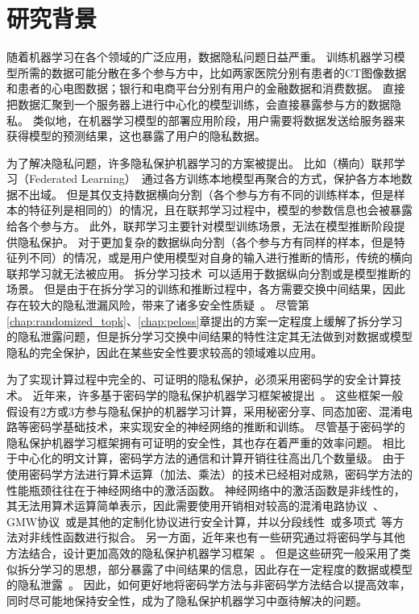 \section{研究背景}
随着机器学习在各个领域的广泛应用，数据隐私问题日益严重。
%
训练机器学习模型所需的数据可能分散在多个参与方中，比如两家医院分别有患者的CT图像数据和患者的心电图数据；银行和电商平台分别有用户的金融数据和消费数据。
%
直接把数据汇聚到一个服务器上进行中心化的模型训练，会直接暴露参与方的数据隐私。
%
类似地，在机器学习模型的部署应用阶段，用户需要将数据发送给服务器来获得模型的预测结果，这也暴露了用户的隐私数据。

%
为了解决隐私问题，许多隐私保护机器学习的方案被提出。
%
比如（横向）联邦学习（Federated Learning）~\cite{yangqiang2019federated,mcmahan_2017_fedavg}通过各方训练本地模型再聚合的方式，保护各方本地数据不出域。
但是其仅支持数据横向分割（各个参与方有不同的训练样本，但是样本的特征列是相同的）的情况，且在联邦学习过程中，模型的参数信息也会被暴露给各个参与方。
%
此外，联邦学习主要针对模型训练场景，无法在模型推断阶段提供隐私保护。
%
对于更加复杂的数据纵向分割（各个参与方有同样的样本，但是特征列不同）的情况，或是用户使用模型对自身的输入进行推断的情形，传统的横向联邦学习就无法被应用。
%
拆分学习技术~\cite{vepakomma2018split}可以适用于数据纵向分割或是模型推断的场景。
但是由于在拆分学习的训练和推断过程中，各方需要交换中间结果，因此存在较大的隐私泄漏风险，带来了诸多安全性质疑~\cite{abuadbba2020can_split,hezecheng_2019_model_inversion_attack}。
尽管第\ref{chap:randomized_topk}、\ref{chap:peloss}章提出的方案一定程度上缓解了拆分学习的隐私泄露问题，但是拆分学习交换中间结果的特性注定其无法做到对数据或模型隐私的完全保护，因此在某些安全性要求较高的领域难以应用。

为了实现计算过程中完全的、可证明的隐私保护，必须采用密码学的安全计算技术。
%
近年来，许多基于密码学的隐私保护机器学习框架被提出~\cite{mohassel2017secureml,wagh2019securenn,mohassel2018aby3}。
%
这些框架一般假设有2方或3方参与隐私保护的机器学习计算，采用秘密分享、同态加密、混淆电路等密码学基础技术，来实现安全的神经网络的推断和训练。
%
尽管基于密码学的隐私保护机器学习框架拥有可证明的安全性，其也存在着严重的效率问题。
相比于中心化的明文计算，密码学方法的通信和计算开销往往高出几个数量级。
%
由于使用密码学方法进行算术运算（加法、乘法）的技术已经相对成熟，密码学方法的性能瓶颈往往在于神经网络中的激活函数。
%
神经网络中的激活函数是非线性的，其无法用算术运算简单表示，因此需要使用开销相对较高的混淆电路协议~\cite{yao1986gc}、GMW协议~\cite{gmw_1987}或是其他的定制化协议进行安全计算，并以分段线性~\cite{mohassel2017secureml}或多项式~\cite{gilad2016cryptonets}等方法对非线性函数进行拟合。
%
另一方面，近年来也有一些研究通过将密码学与其他方法结合，设计更加高效的隐私保护机器学习框架~\cite{zhangqiao_2018_gelu_net,xiepeichen_2019_bayhenn,zhou_2022_codesign}。
%
但是这些研究一般采用了类似拆分学习的思想，部分暴露了中间结果的信息，因此存在一定程度的数据或模型的隐私泄露~\cite{wong_2020_lwe_model,abuadbba2020can_split,hezecheng_2019_model_inversion_attack}。
%
因此，如何更好地将密码学方法与非密码学方法结合以提高效率，同时尽可能地保持安全性，成为了隐私保护机器学习中亟待解决的问题。
